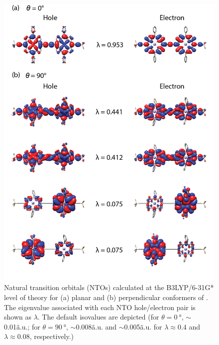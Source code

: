 		\begin{figure}[ht!]
			\centering\includegraphics{figures/dimer/Figure-10.png} 
			\caption[]{Natural transition orbitals (NTOs) calculated at the B3LYP/6-31G* level of theory for (a) planar and (b) perpendicular conformers of . The eigenvalue associated with each NTO hole/electron pair is shown as $\lambda$. The default isovalues are depicted (for $\theta = \SI{0}{\degree}$, $\sim$0.01\~a.u.; for $\theta = \SI{90}{\degree}$, $\sim$0.008\~a.u. and $\sim$0.005\~a.u. for $\lambda \approx 0.4$ and $\lambda \approx 0.08$, respectively.)}
			\label{fig:dimer:f10}
		\end{figure}

